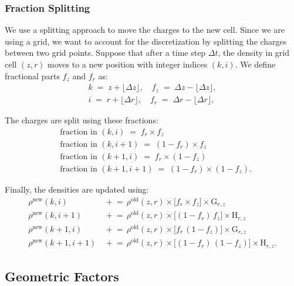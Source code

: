 \subsubsection*{Fraction Splitting}\label{ch3:sec:frac_split}
We use a splitting approach to move the charges to the new cell. Since we are using a grid, we want to account for the discretization by splitting the charges between two grid points. Suppose that after a time step $\Delta t$, the density in grid cell $(z,r)$ moves to a new position with integer indices $(k,i)$. We define fractional parts $f_z$ and $f_r$ as:
%
\begin{align}
k \;=\; z + \lfloor \Delta z \rfloor,\quad
f_z \;=\; \Delta z - \lfloor \Delta z \rfloor,\\
i \;=\; r + \lfloor \Delta r \rfloor,\quad
f_r \;=\; \Delta r - \lfloor \Delta r \rfloor,
\end{align}


The charges are split using these fractions:
\begin{align}
&\text{fraction in }(k, i)   \;=\; f_{r} \times f_{z} \\
&\text{fraction in }(k, i+1) \;=\; (1 - f_{r}) \times f_{z}\\
&\text{fraction in }(k+1, i) \;=\; f_{r} \times (1 - f_{z})\\
&\text{fraction in }(k+1, i+1)\;=\; (1 - f_{r}) \times (1 - f_{z}).
\label{eq:bilinear-fractions}
\end{align}

Finally, the densities are updated using:
\begin{align}
\rho^{\mathrm{new}}(k,i)   &\,\mathrel{+}=\, \rho^{\mathrm{old}}(z,r)\times \bigl[f_{r}\times f_{z}\bigr] \times \text{G}_{r,z} \label{ch3:eq:den_update_1} \\
\rho^{\mathrm{new}}(k,i+1) &\,\mathrel{+}=\, \rho^{\mathrm{old}}(z,r)\times \bigl[(1 - f_{r})\,f_{z}\bigr] \times \text{H}_{r,z} \label{ch3:eq:den_update_2} \\
\rho^{\mathrm{new}}(k+1,i) &\,\mathrel{+}=\, \rho^{\mathrm{old}}(z,r)\times \bigl[f_{r}\,(1 - f_{z})\bigr] \times \text{G}_{r,z} \label{ch3:eq:den_update_3} \\
\rho^{\mathrm{new}}(k+1,i+1)&\,\mathrel{+}=\, \rho^{\mathrm{old}}(z,r)\times \bigl[(1 - f_{r})\,(1 - f_{z})\bigr] \times \text{H}_{r,z}. \label{ch3:eq:den_update_4}
\end{align}
\subsection{Geometric Factors}
\label{sec:geom-factor}

